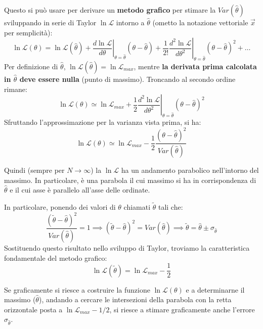 \documentclass[openany,a4paper,12pt]{book}
\providecommand{\mathscr}[1]{\mathcal{#1}}
\theoremstyle{remark}
\begin{document}
Questo si può usare per derivare un \textbf{metodo grafico} per stimare la $Var(\hat{\theta})$ sviluppando in serie di Taylor $\ln \mathscr{L}$ intorno a $\hat{\theta}$ (ometto la notazione vettoriale $\vec{x}$ per semplicità):
\begin{equation*}
    \ln \mathscr{L}(\theta) = \ln \mathscr{L}(\hat{\theta}) + \left. \frac{d \ln \mathscr{L}}{d\theta} \right|_{\theta = \hat{\theta}} (\theta - \hat{\theta}) + \frac{1}{2!} \left. \frac{d^2 \ln \mathscr{L}}{d\theta^2} \right|_{\theta = \hat{\theta}} (\theta - \hat{\theta})^2 + \dots
\end{equation*}
Per definizione di $\hat{\theta}$, $\ln \mathscr{L}(\hat{\theta}) = \ln \mathscr{L}_{max}$, mentre \textbf{la derivata prima calcolata in $\hat{\theta}$ deve essere nulla} (punto di massimo). Troncando al secondo ordine rimane:
\begin{equation*}
    \ln \mathscr{L}(\theta) \simeq \ln \mathscr{L}_{max} + \frac{1}{2} \left. \frac{d^2 \ln \mathscr{L}}{d\theta^2} \right|_{\theta = \hat{\theta}} (\theta - \hat{\theta})^2
\end{equation*}
Sfruttando l'approssimazione per la varianza vista prima, si ha:
\begin{equation}
    \ln \mathscr{L}(\theta) \simeq \ln \mathscr{L}_{max} - \frac{1}{2} \frac{(\theta - \hat{\theta})^2}{Var(\hat{\theta})}
\end{equation}

Quindi (sempre per $N \to \infty$) la $\ln \mathscr{L}$ ha un andamento parabolico nell'intorno del massimo. In particolare, è una parabola il cui massimo si ha in corrispondenza di $\hat{\theta}$ e il cui asse è parallelo all'asse delle ordinate. 

In particolare, ponendo dei valori di $\theta$ chiamati $\tilde{\theta}$ tali che:
\begin{equation}
    \frac{(\tilde{\theta} - \hat{\theta})^2}{Var(\hat{\theta})} = 1 \implies (\tilde{\theta} - \hat{\theta})^2 = Var(\hat{\theta}) \implies \tilde{\theta} = \hat{\theta} \pm \sigma_{\hat{\theta}}
    \label{eq:appunto}
\end{equation}
Sostituendo questo risultato nello sviluppo di Taylor, troviamo la caratteristica fondamentale del metodo grafico:
\begin{equation}
    \ln \mathscr{L}(\tilde{\theta}) = \ln \mathscr{L}_{max} - \frac{1}{2}
\end{equation}

Se graficamente si riesce a costruire la funzione $\ln \mathscr{L}(\theta)$ e a determinarne il massimo ($\hat{\theta}$), andando a cercare le intersezioni della parabola con la retta orizzontale posta a $\ln \mathscr{L}_{max} - 1/2$, si riesce a stimare graficamente anche l'errore $\sigma_{\hat{\theta}}$.
\end{document}
